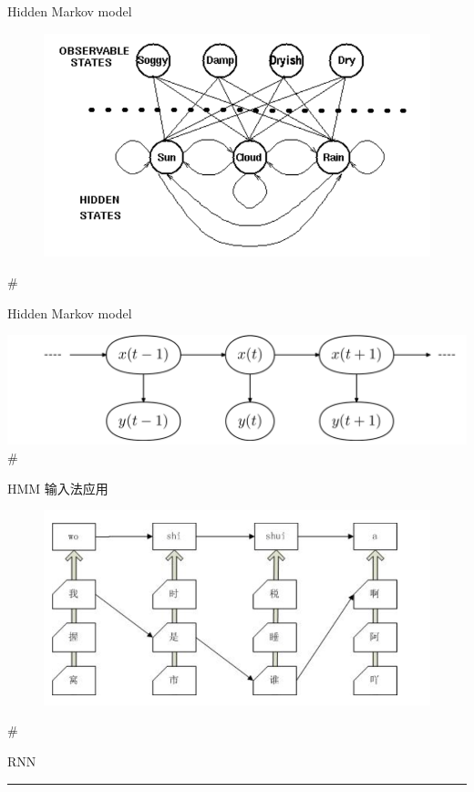 \documentclass[11pt]{article}
\makeatletter
\def\maxwidth{\ifdim\Gin@nat@width>\linewidth\linewidth
    \else\Gin@nat@width\fi}
\let\Oldincludegraphics\includegraphics
\renewcommand{\includegraphics}[1]{\Oldincludegraphics[width=.8\maxwidth]{#1}}
\makeatother
\begin{document}
Hidden Markov model

\begin{figure}
\centering
\includegraphics{weather1.png}
\caption{}
\end{figure}

    \#

Hidden Markov model

\includegraphics{HMM.png} \#

HMM 输入法应用

\begin{figure}
\centering
\includegraphics{输入法.png}
\caption{}
\end{figure}

    \#

RNN

\begin{center}\rule{0.5\linewidth}{\linethickness}\end{center}
\end{document}
